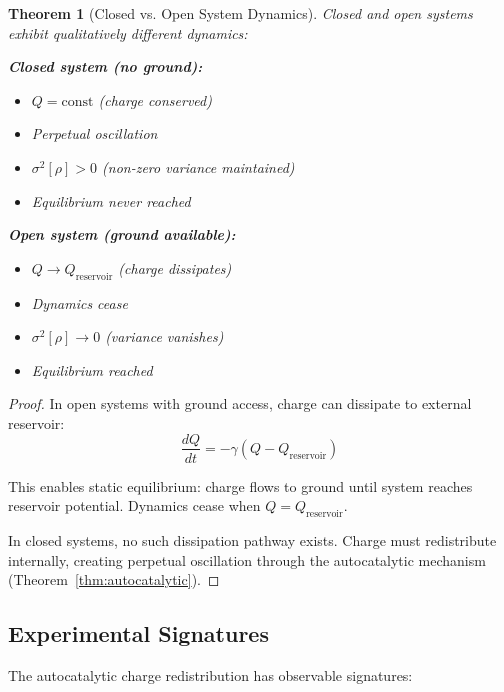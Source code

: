 \documentclass[12pt,a4paper]{article}
\theoremstyle{plain}
\newtheorem{theorem}{Theorem}[section]
\theoremstyle{definition}
\theoremstyle{remark}
\begin{document}
\begin{theorem}[Closed vs. Open System Dynamics]
\label{thm:closed_vs_open}
Closed and open systems exhibit qualitatively different dynamics:

\textbf{Closed system (no ground):}
\begin{itemize}
\item $Q = \text{const}$ (charge conserved)
\item Perpetual oscillation
\item $\sigma^2[\rho] > 0$ (non-zero variance maintained)
\item Equilibrium never reached
\end{itemize}

\textbf{Open system (ground available):}
\begin{itemize}
\item $Q \to Q_{\text{reservoir}}$ (charge dissipates)
\item Dynamics cease
\item $\sigma^2[\rho] \to 0$ (variance vanishes)
\item Equilibrium reached
\end{itemize}
\end{theorem}

\begin{proof}
In open systems with ground access, charge can dissipate to external reservoir:
\begin{equation}
\frac{dQ}{dt} = -\gamma (Q - Q_{\text{reservoir}})
\end{equation}

This enables static equilibrium: charge flows to ground until system reaches reservoir potential. Dynamics cease when $Q = Q_{\text{reservoir}}$.

In closed systems, no such dissipation pathway exists. Charge must redistribute internally, creating perpetual oscillation through the autocatalytic mechanism (Theorem~\ref{thm:autocatalytic}).
\end{proof}

\subsection{Experimental Signatures}

The autocatalytic charge redistribution has observable signatures:
\end{document}
